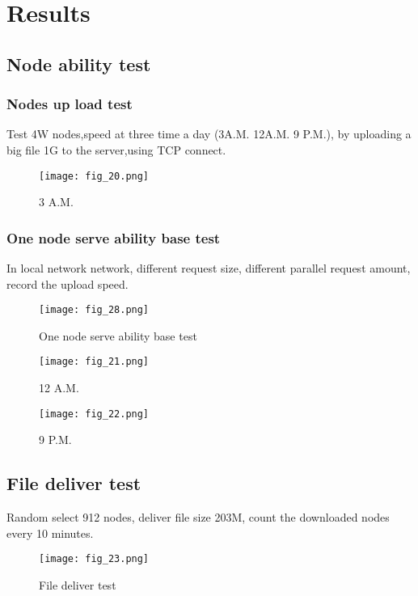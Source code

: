 \chapter{Results}
\label{chap:chap-four}
\section{Node ability test}
\subsection{Nodes up load test}
 Test 4W nodes,speed at three time a day (3A.M. 12A.M. 9 P.M.),
by uploading a big file 1G to the server,using TCP connect.
\begin{figure}[htbp]
\centering
	  \texttt{[image: fig\_20.png]}
    \caption{3 A.M.}
 \label{fig_20}
\end{figure}
\subsection{One node serve ability base test}
In local network network, different request size, different parallel request amount, record the upload speed.

\begin{figure}[htbp]
\centering
	  \texttt{[image: fig\_28.png]}
    \caption{One node serve ability base test}
 \label{fig_28}
\end{figure}

\begin{figure}[htbp]
\centering
	  \texttt{[image: fig\_21.png]}
    \caption{12 A.M.}
 \label{fig_21}
\end{figure}
\begin{figure}[htbp]
\centering
	  \texttt{[image: fig\_22.png]}
    \caption{9 P.M.}
 \label{fig_22}
\end{figure}
\section{File deliver test}
Random select 912 nodes, deliver file size 203M, count the downloaded nodes every 10 minutes.
\begin{figure}[htbp]
\centering
	  \texttt{[image: fig\_23.png]}
    \caption{File deliver test}
 \label{fig_23}
\end{figure}
